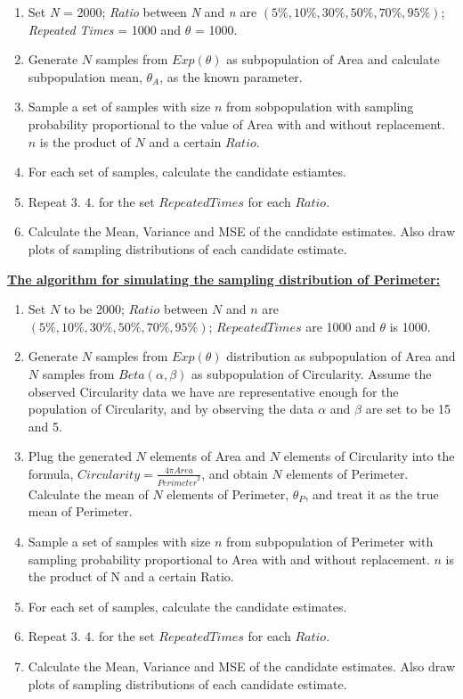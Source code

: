 \documentclass{article}\usepackage[]{graphicx}\usepackage[]{color}
\numberwithin{figure}{subsection} %
\numberwithin{table}{subsection} %
\begin{document}
\begin{enumerate}
  \item Set \textit{N} = 2000; \textit{Ratio} between \textit{N} and \textit{n} are $\left( 5\%, 10\%, 30\%, 50\%, 70\%, 95\% \right)$; \textit{Repeated Times} = 1000 and $\theta$ = 1000. 
  \item Generate $N$ samples from $Exp(\theta)$ as subpopulation of Area and calculate subpopulation mean, ${\theta}_{A}$, as the known parameter. 
  \item Sample a set of samples with size $n$ from sobpopulation with sampling probability proportional to the value of Area with and without replacement. $n$ is the product of $N$ and a certain $Ratio$.
  \item For each set of samples, calculate the candidate estiamtes.
  \item Repeat 3. 4. for the set $Repeated Times$ for each $Ratio$. 
  \item Calculate the Mean, Variance and MSE of the candidate estimates. Also draw plots of sampling distributions of each candidate estimate.
\end{enumerate}


\bigskip
\setlength{\parskip}{0em}
\noindent\textbf{\underline{The algorithm for simulating the sampling distribution of Perimeter:}}

\begin{enumerate}
  \item Set $N$ to be 2000; $Ratio$ between $N$ and $n$ are $\left( 5\%, 10\%, 30\%, 50\%, 70\%, 95\% \right)$; $Repeated Times$ are 1000 and $\theta$ is 1000. 
  \item Generate $N$ samples from $Exp(\theta)$ distribution as subpopulation of Area and $N$ samples from $Beta(\alpha, \beta)$ as subpopulation of Circularity. Assume the observed Circularity data we have are representative enough for the population of Circularity, and by observing the data $\alpha$ and $\beta$ are set to be 15 and 5.  
  \item Plug the generated $N$ elements of Area and $N$ elements of Circularity into the formula, $Circularity=\frac{4\pi Area}{{Perimeter}^{2}}$, and obtain $N$ elements of Perimeter. Calculate the mean of $N$ elements of Perimeter, ${\theta}_{P}$, and treat it as the true mean of Perimeter. 
  \item Sample a set of samples with size $n$ from subpopulation of Perimeter with sampling probability proportional to Area with and without replacement. $n$ is the product of N and a certain Ratio.
  \item For each set of samples, calculate the candidate estimates.
  \item Repeat 3. 4. for the set $Repeated Times$ for each $Ratio$. 
  \item Calculate the Mean, Variance and MSE of the candidate estimates. Also draw plots of sampling distributions of each candidate estimate.
\end{enumerate}
\end{document}
